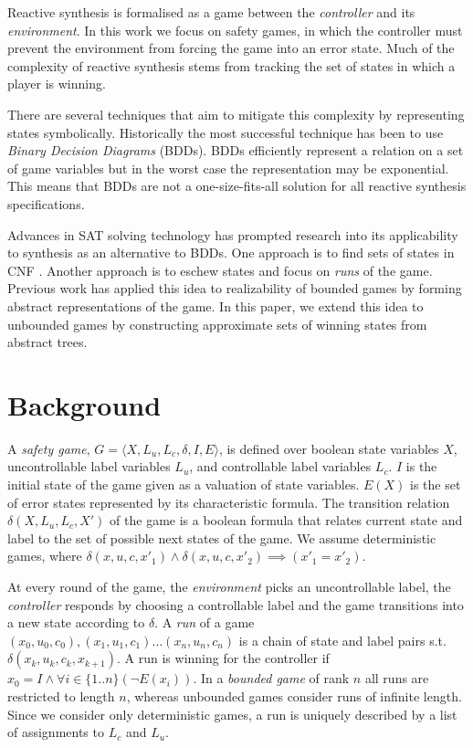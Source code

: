 \documentclass{llncs}
\begin{document}
Reactive synthesis is formalised as a game between the \emph{controller} and
its \emph{environment}. In this work we focus on safety games, in which the
controller must prevent the environment from forcing the game into an error
state.  Much of the complexity of reactive synthesis stems from tracking the
set of states in which a player is winning.

There are several techniques that aim to mitigate this complexity by
representing states symbolically.  Historically the most successful technique
has been to use \emph{Binary Decision Diagrams} (BDDs).  BDDs efficiently
represent a relation on a set of game variables but in the worst case the
representation may be exponential. This means that BDDs are not a
one-size-fits-all solution for all reactive synthesis specifications.

Advances in SAT solving technology has prompted research into its applicability
to synthesis as an alternative to BDDs. One approach is to find sets of states
in CNF \cite{bloem2014}. Another approach is to eschew states and focus on
\emph{runs} of the game. Previous work has applied this idea to realizability
of bounded games \cite{narodytska2014} by forming abstract representations of
the game.  In this paper, we extend this idea to unbounded games by
constructing approximate sets of winning states from abstract trees.

\section{Background}

A \emph{safety game}, $G = \langle X, L_u, L_c, \delta, I, E \rangle$,
is defined over boolean state variables $X$, uncontrollable label variables $L_u$, and
controllable label variables $L_c$.  $I$ is the initial state of the game given as a 
valuation of state variables.  $E(X)$ is the set of error states represented by its 
characteristic formula.  The transition relation $\delta(X, L_u, L_c, X')$ of the game 
is a boolean formula that relates current state and label to the set of possible next 
states of the game.  We assume deterministic games, where 
$\delta(x,u,c,x'_1) \land \delta(x,u,c,x'_2) \implies (x'_1=x'_2)$.


At every round of the game, the \emph{environment} picks an
uncontrollable label, the \emph{controller} responds by choosing a controllable 
label and the game transitions into a new state according to $\delta$. 
A \emph{run} of a game $(x_0, u_0, c_0), (x_1, u_1, c_1) \dots (x_n, u_n,
c_n)$ is a chain of state and label pairs s.t.\,$\delta(x_k, u_k, c_k, x_{k+1})$. 
A run is winning for the controller if $x_0 = I \land \forall i \in \{1..n\} (\lnot E(x_i))$. 
In a \emph{bounded game} of rank $n$ all runs are restricted to length $n$, whereas unbounded 
games consider runs of infinite length. Since we consider only deterministic games, a run 
is uniquely described by a list of assignments to $L_c$ and $L_u$.
\end{document}

